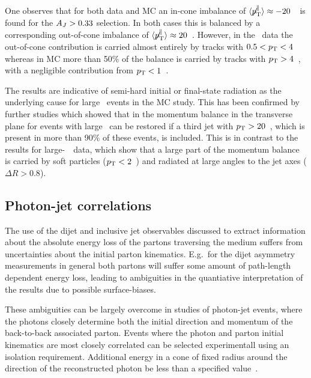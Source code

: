 One observes that for both data and MC an in-cone imbalance of $\langle \displaystyle{\not} p_{\mathrm{T}}^{\parallel} \rangle \approx
-20$~\GeVc\ is found for the $A_J > 0.33$ selection. In both cases this is balanced by a corresponding out-of-cone
imbalance of  $\langle \displaystyle{\not} p_{\mathrm{T}}^{\parallel} \rangle \approx 20$~\GeVc. However, in the \PbPb\ data
the out-of-cone contribution is carried almost entirely  by tracks with $0.5 < p_{\rm{T}} < 4$~\GeVc\, whereas in MC more than 50\% of the balance
is carried by tracks with $p_{\rm{T}} > 4$~\GeVc, with a negligible contribution from $p_{\rm{T}} < 1$~\GeVc.


The {} results are indicative of semi-hard initial or final-state radiation as the underlying cause for large
\AJ\ events in the MC study. This has been confirmed by further studies which showed that in {} the momentum balance
in the transverse plane for events with large \AJ\ can be restored if a third jet with $p_{\rm{T}} > 20$~\GeVc, which is present in more
than 90\% of these events, is included. This is in contrast to the results for large-\AJ\ \PbPb\ data, which show that a
large part of the momentum balance is carried by soft particles ($p_{\rm{T}} < 2$~\GeVc) and radiated
at large angles to the jet axes ($\Delta R > 0.8$).


\subsection{Photon-jet correlations}

The use of the dijet and inclusive jet observables discussed to extract information
about the absolute energy loss of the partons traversing the medium suffers from
uncertainties about the initial parton kinematics. E.g.\ for the dijet asymmetry 
measurements in general both partons will suffer some amount of path-length dependent
energy loss, leading to ambiguities in the quantiative interpretation of the results
due to possible surface-biases. 

These ambiguities can be largely overcome in studies of photon-jet events, 
where the photons closely determine both the initial direction and momentum 
of the back-to-back associated parton.
Events where the photon and parton initial kinematics are most closely correlated 
can be selected experimentall using an isolation requirement. Additional energy
in a cone of fixed radius around the direction of the reconstructed
photon be less than a specified value~\cite{HIPhoton}. 

